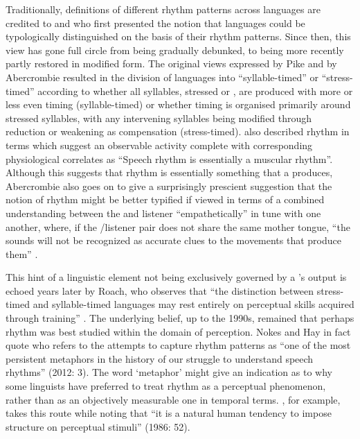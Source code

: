 \documentclass[output=paper]{langsci/langscibook}
\begin{document}
Traditionally, definitions of different rhythm patterns across languages are credited to \citet{Pike1945} and \citet[96]{Abercrombie1967} who first presented the notion that languages could be typologically distinguished on the basis of their rhythm patterns. Since then, this view has gone full circle from being gradually debunked, to being more recently partly restored in modified form. The original views expressed by Pike and by Abercrombie resulted in the division of languages into “syllable-timed” or “stress-timed” according to whether all syllables, stressed or , are produced with more or less even timing (syllable-timed) or whether timing is organised primarily around stressed syllables, with any intervening syllables being modified through reduction or weakening as compensation (stress-timed). 
\citet[97]{Abercrombie1967} also described rhythm in terms which suggest an observable activity complete with corresponding physiological correlates as “Speech rhythm is essentially a muscular rhythm”. Although this suggests that rhythm is essentially something that a  produces, Abercrombie also goes on to give a surprisingly prescient suggestion that the notion of rhythm might be better typified if viewed in terms of a combined understanding between the  and listener “empathetically” in tune with one another, where, if the /listener pair does not share the same mother tongue, “the sounds will not be recognized as accurate clues to the movements that produce them” \citep[97]{Abercrombie1967}. 

This hint of a linguistic element not being exclusively governed by a 's output is echoed years later by Roach, who observes that “the distinction between stress-timed and syllable-timed languages may rest entirely on perceptual skills acquired through training” \citep[73]{Roach1982}. The underlying belief, up to the 1990s, remained that perhaps rhythm was best studied within the domain of perception. Nokes and Hay in fact quote \citet{Beckman1992} who refers to the attempts to capture rhythm patterns as “one of the most persistent metaphors in the history of our struggle to understand speech rhythms” (2012: 3). The word ‘metaphor’ might give an indication as to why some linguists have preferred to treat rhythm as a perceptual phenomenon, rather than as an objectively measurable one in temporal terms. \citet{CouperKuhlen1986}, for example, takes this route while noting that “it is a natural human tendency to impose structure on perceptual stimuli” (1986: 52).
\end{document}

